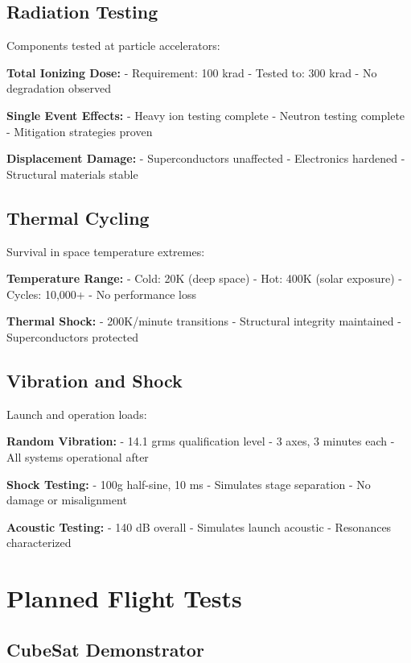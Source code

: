 \documentclass[12pt,letterpaper]{book}
\theoremstyle{definition}
\theoremstyle{plain}
\theoremstyle{remark}
\begin{document}
{{{{{\subsection{Radiation Testing}

Components tested at particle accelerators:

\textbf{Total Ionizing Dose:}
- Requirement: 100 krad
- Tested to: 300 krad
- No degradation observed

\textbf{Single Event Effects:}
- Heavy ion testing complete
- Neutron testing complete
- Mitigation strategies proven

\textbf{Displacement Damage:}
- Superconductors unaffected
- Electronics hardened
- Structural materials stable

\subsection{Thermal Cycling}

Survival in space temperature extremes:

\textbf{Temperature Range:}
- Cold: 20K (deep space)
- Hot: 400K (solar exposure)
- Cycles: 10,000+
- No performance loss

\textbf{Thermal Shock:}
- 200K/minute transitions
- Structural integrity maintained
- Superconductors protected

\subsection{Vibration and Shock}

Launch and operation loads:

\textbf{Random Vibration:}
- 14.1 grms qualification level
- 3 axes, 3 minutes each
- All systems operational after

\textbf{Shock Testing:}
- 100g half-sine, 10 ms
- Simulates stage separation
- No damage or misalignment

\textbf{Acoustic Testing:}
- 140 dB overall
- Simulates launch acoustic
- Resonances characterized

\section{Planned Flight Tests}

\subsection{CubeSat Demonstrator}

}}}}}
\end{document}
